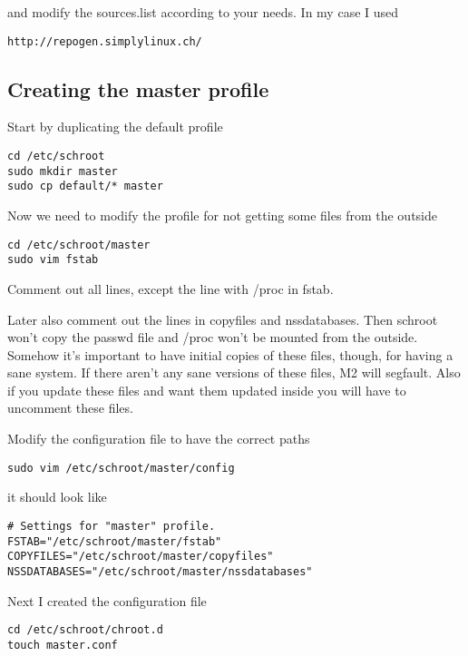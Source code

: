 \documentclass[a4paper]{article}
\begin{document}
and modify the sources.list according to your needs. In my case I used

\begin{verbatim}
http://repogen.simplylinux.ch/
\end{verbatim}

\subsection{Creating the master profile}

Start by duplicating the default profile

\begin{verbatim}
cd /etc/schroot
sudo mkdir master
sudo cp default/* master
\end{verbatim}

Now we need to modify the profile for not getting some files from the outside

\begin{verbatim}
cd /etc/schroot/master
sudo vim fstab
\end{verbatim}

Comment out all lines, except the line with /proc in fstab. 

Later also comment out the lines in copyfiles and nssdatabases. 
Then schroot won't copy the passwd file and /proc won't be mounted from the outside.
Somehow it's important to have initial copies of these files, though, for having a sane system. If there aren't any sane versions of these files, M2 will segfault.
Also if you update these files and want them updated inside you will have to uncomment these files.

Modify the configuration file to have the correct paths

\begin{verbatim}
sudo vim /etc/schroot/master/config
\end{verbatim}

it should look like

\begin{verbatim}
# Settings for "master" profile.
FSTAB="/etc/schroot/master/fstab"
COPYFILES="/etc/schroot/master/copyfiles"
NSSDATABASES="/etc/schroot/master/nssdatabases"
\end{verbatim}

Next I created the configuration file

\begin{verbatim}
cd /etc/schroot/chroot.d
touch master.conf
\end{verbatim}
\end{document}

